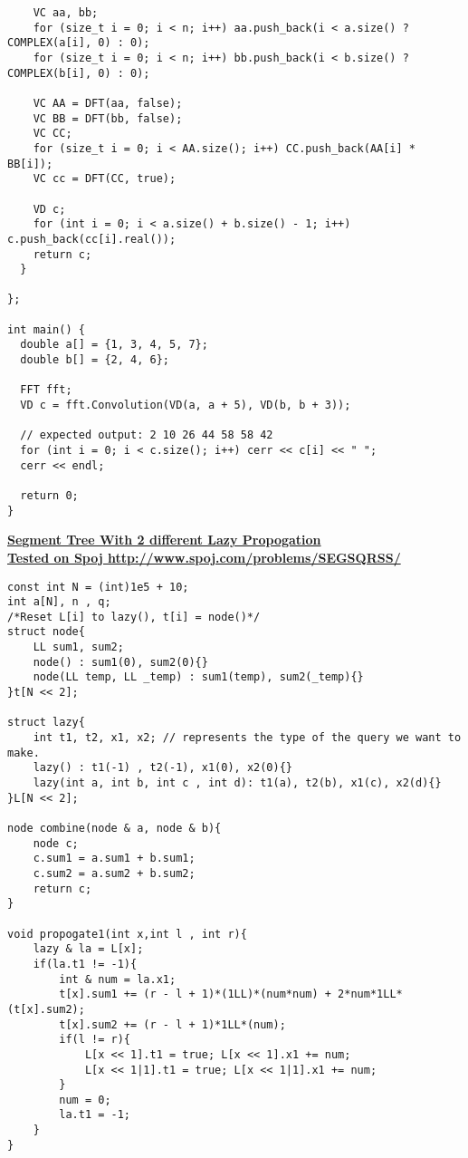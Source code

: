 \documentclass[10pt,a4paper]{report}
\begin{document}
\begin{landscape}
\begin{multicols}{2}
\begin{verbatim}
    VC aa, bb;
    for (size_t i = 0; i < n; i++) aa.push_back(i < a.size() ? COMPLEX(a[i], 0) : 0);
    for (size_t i = 0; i < n; i++) bb.push_back(i < b.size() ? COMPLEX(b[i], 0) : 0);
    
    VC AA = DFT(aa, false);
    VC BB = DFT(bb, false);
    VC CC;
    for (size_t i = 0; i < AA.size(); i++) CC.push_back(AA[i] * BB[i]);
    VC cc = DFT(CC, true);

    VD c;
    for (int i = 0; i < a.size() + b.size() - 1; i++) c.push_back(cc[i].real());
    return c;
  }

};

int main() {
  double a[] = {1, 3, 4, 5, 7};
  double b[] = {2, 4, 6};

  FFT fft;
  VD c = fft.Convolution(VD(a, a + 5), VD(b, b + 3));

  // expected output: 2 10 26 44 58 58 42
  for (int i = 0; i < c.size(); i++) cerr << c[i] << " ";
  cerr << endl;
  
  return 0;
}
\end{verbatim}

\begin{flushleft}
\textbf{\underline{Segment Tree With 2 different Lazy Propogation}}\\
\textbf{\underline{Tested on Spoj http://www.spoj.com/problems/SEGSQRSS/}}\\
\end{flushleft}

\begin{verbatim}
const int N = (int)1e5 + 10; 
int a[N], n , q; 
/*Reset L[i] to lazy(), t[i] = node()*/
struct node{
	LL sum1, sum2; 
	node() : sum1(0), sum2(0){}
	node(LL temp, LL _temp) : sum1(temp), sum2(_temp){}
}t[N << 2]; 

struct lazy{
	int t1, t2, x1, x2; // represents the type of the query we want to make. 
	lazy() : t1(-1) , t2(-1), x1(0), x2(0){}
	lazy(int a, int b, int c , int d): t1(a), t2(b), x1(c), x2(d){}
}L[N << 2]; 

node combine(node & a, node & b){
	node c;
	c.sum1 = a.sum1 + b.sum1; 
	c.sum2 = a.sum2 + b.sum2; 
	return c; 
}

void propogate1(int x,int l , int r){
	lazy & la = L[x]; 
	if(la.t1 != -1){
		int & num = la.x1; 
		t[x].sum1 += (r - l + 1)*(1LL)*(num*num) + 2*num*1LL*(t[x].sum2); 
		t[x].sum2 += (r - l + 1)*1LL*(num);
		if(l != r){
			L[x << 1].t1 = true; L[x << 1].x1 += num; 
			L[x << 1|1].t1 = true; L[x << 1|1].x1 += num; 
		}
		num = 0; 
		la.t1 = -1; 
	}
}


\end{verbatim}
\end{multicols}
\end{landscape}
\end{document}
